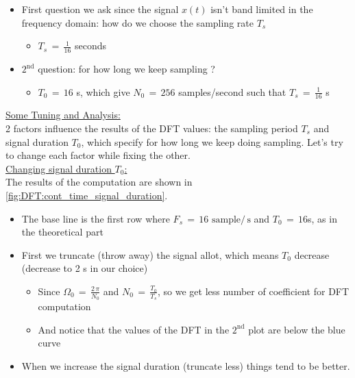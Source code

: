 \begin{itemize}

\item First question we ask since the signal $x(t)$ isn't band limited in the frequency domain: how do we choose the sampling rate $T_s$

	\begin{itemize}
	\item $T_s \, = \, \displaystyle\frac{1}{16}$ seconds
	\end{itemize}
	
\item $\mathrm{2}^\mathrm{nd}$ question: for how long we keep sampling ?

	\begin{itemize}
	\item $T_0 \, = \, 16$ s, which give $N_0 \, = \, 256$ samples/second
	such that $T_s \, = \, \displaystyle\frac{1}{16}$ s
	\end{itemize}

\end{itemize}


\underline{Some Tuning and Analysis:}\\

2 factors influence the results of the DFT values: the sampling period $T_s$ and signal duration $T_0$, which specify for how long we keep doing sampling. Let's try to change each factor while fixing the other.\\

\underline{Changing signal duration $T_0$:}\\


The results of the computation are shown in \autoref{fig:DFT:cont_time_signal_duration}.

\begin{itemize}

\item The base line is the first row where $F_s \, = \, 16 \text{ sample}/\,\text{s}$ and $T_0 \, = \, 16$s, as in the theoretical part

\item First we truncate (throw away) the signal allot, which means $T_0$ decrease (decrease to 2 s in our choice)

	\begin{itemize}
	\item Since $\Omega_0 \, = \, \displaystyle\frac{2 \, \pi}{N_0}$ and $N_0 \, = \, \displaystyle\frac{T_0}{T_s}$, so we get less number of coefficient for DFT computation
	
	\item And notice that the values of the DFT in the $\mathrm{2}^\mathrm{nd}$ plot are below the blue curve
	\end{itemize}	 

\item When we increase the signal duration (truncate less) things tend to be better.

\end{itemize}

